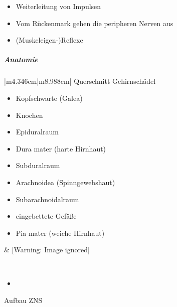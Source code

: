 \documentclass{article}
\begin{document}
\begin{itemize}
\item Weiterleitung von Impulsen

\item Vom R\"uckenmark gehen die peripheren Nerven aus

\item (Muskeleigen-)Reflexe

\end{itemize}
\subparagraph{Anatomie}
\begin{center}
\tablehead{}\begin{supertabular}{|m{4.346cm}|m{8.988cm}|}
\hline
Querschnitt Gehirnsch\"adel

\begin{itemize}
\item Kopfschwarte (Galea)

\item Knochen

\item {}Epiduralraum

\item {}Dura mater (harte
Hirnhaut)

\item {}Subduralraum

\item {}Arachnoidea (Spinngewebshaut)

\item {}Subarachnoidalraum

\item eingebettete Gef\"a{\ss}e

\item Pia mater (weiche Hirnhaut)

\end{itemize}
 &
  [Warning: Image ignored] %
 

\\\hline
\end{supertabular}
\end{center}
\begin{itemize}
\item \end{itemize}
Aufbau ZNS
\end{document}
